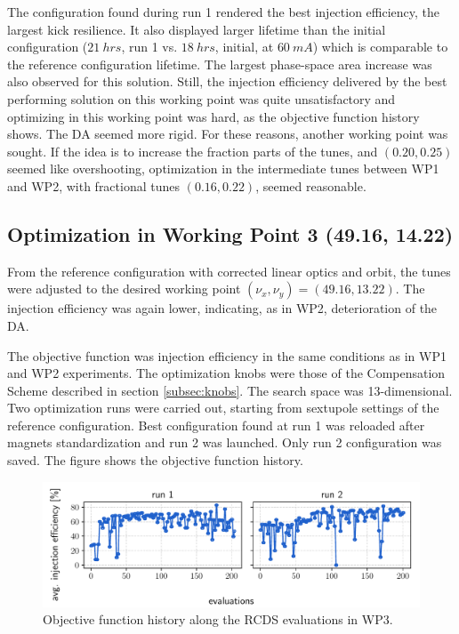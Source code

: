 The configuration found during run 1 rendered the best injection efficiency, the largest kick resilience. It also displayed larger lifetime than the initial configuration ($21~\unit{hrs}$, run 1 vs. $18~\unit{hrs}$, initial, at $60~\unit{mA}$) which is comparable to the reference configuration lifetime. The largest phase-space area increase was also observed for this solution. Still, the injection efficiency delivered by the best performing solution on this working point was quite unsatisfactory and optimizing in this working point was hard, as the objective function history shows. The DA seemed more rigid. For these reasons, another working point was sought. If the idea is to increase the fraction parts of the tunes, and $(0.20, 0.25)$ seemed like overshooting, optimization in the intermediate tunes between WP1 and WP2, with fractional tunes $(0.16, 0.22)$, seemed reasonable.
\subsection{Optimization in Working Point 3 (49.16, 14.22)}
From the reference configuration with corrected linear optics and orbit, the tunes were adjusted to the desired working point $(\nu_x, \nu_y)=(49.16, 13.22)$. The injection efficiency was again lower, indicating, as in WP2, deterioration of the DA.

The objective function was injection efficiency in the same conditions as in WP1 and WP2 experiments. The optimization knobs were those of the Compensation Scheme described in section \ref{subsec:knobs}. The search space was 13-dimensional. Two optimization runs were carried out, starting from sextupole settings of the reference configuration. Best configuration found at run 1 was reloaded after magnets standardization and run 2 was launched. Only run 2 configuration was saved. The figure shows the objective function history.
\begin{figure}[tb]
    \centering
    \includegraphics[width=\columnwidth]{Images/wp3_objfunc_hist.pdf}
    \caption[Objective function history along the RCDS evaluations in WP3.]{Objective function history along the RCDS evaluations in WP3.}
\end{figure}
